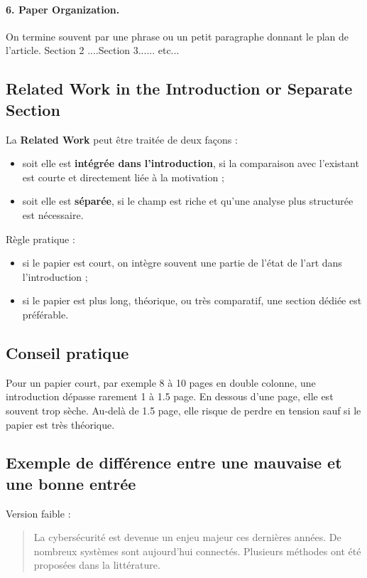 \documentclass[11pt,a4paper]{article}
\theoremstyle{definition}
\begin{document}
\paragraph{6. Paper Organization.}
On termine souvent par une phrase ou un petit paragraphe donnant le plan de l'article. Section 2 ....Section  3...... etc...

\subsection*{Related Work in the Introduction or Separate Section}

La \textbf{Related Work} peut être traitée de deux façons :
\begin{itemize}
    \item soit elle est \textbf{intégrée dans l'introduction}, si la comparaison avec l'existant est courte et directement liée à la motivation ;
    \item soit elle est \textbf{séparée}, si le champ est riche et qu'une analyse plus structurée est nécessaire.
\end{itemize}

Règle pratique :
\begin{itemize}
    \item si le papier est court, on intègre souvent une partie de l'état de l'art dans l'introduction ;
    \item si le papier est plus long, théorique, ou très comparatif, une section dédiée est préférable.
\end{itemize}

\subsection*{Conseil pratique}

Pour un papier court, par exemple 8 à 10 pages en double colonne, une introduction dépasse rarement 1 à 1.5 page. En dessous d'une page, elle est souvent trop sèche. Au-delà de 1.5 page, elle risque de perdre en tension sauf si le papier est très théorique.


\subsection*{Exemple de différence entre une mauvaise et une bonne entrée}

Version faible :
\begin{quote}
La cybersécurité est devenue un enjeu majeur ces dernières années. De nombreux systèmes sont aujourd'hui connectés. Plusieurs méthodes ont été proposées dans la littérature.
\end{quote}
\end{document}
